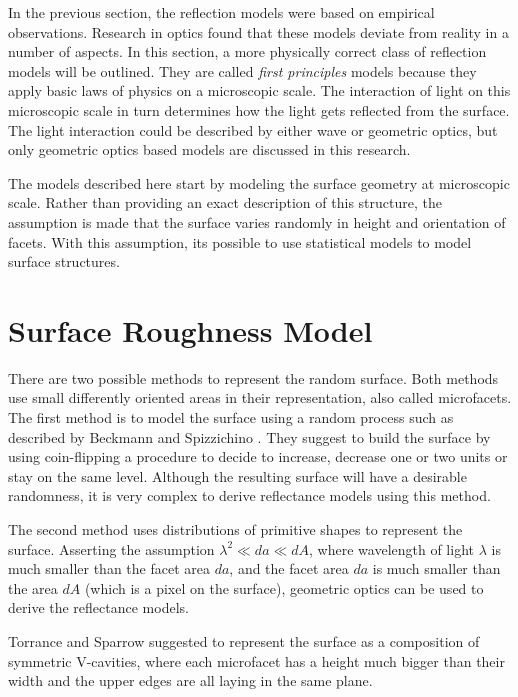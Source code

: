 \hypertarget{Microfacet Models}{
}

\noindent In the previous section, the reflection models were based on empirical observations. Research in optics found that these models deviate from reality in a number of aspects. In this section, a more physically correct class of reflection models will be outlined. They are called \textit{first principles} models because they apply basic laws of physics on a microscopic scale. The interaction of light on this microscopic scale in turn determines how the light gets reflected from the surface. The light interaction could be described by either wave or geometric optics, but only geometric optics based models are discussed in this research.

The models described here start by modeling the surface geometry at microscopic scale. Rather than providing an exact description of this structure, the assumption is made that the surface varies randomly in height and orientation of facets. With this assumption, its possible to use statistical models to model surface structures.

\section{Surface Roughness Model}
There are two possible methods to represent the random surface. Both methods use small differently oriented areas in their representation, also called microfacets. The first method is to model the surface using a random process such as described by Beckmann and Spizzichino \cite{BeckmannSpizzichino}. They suggest to build the surface by using coin-flipping a procedure to decide to increase, decrease one or two units or stay on the same level. Although the resulting surface will have a desirable randomness, it is very complex to derive reflectance models using this method. 

The second method uses distributions of primitive shapes to represent the surface. Asserting the assumption $\lambda^2 \ll da \ll dA$, where wavelength of light $\lambda$ is much smaller than the facet area $da$, and the facet area $da$ is much smaller than the area $dA$ (which is a pixel on the surface), geometric optics can be used to derive the reflectance models. 

Torrance and Sparrow suggested to represent the surface as a composition of symmetric V-cavities, where each microfacet has a height much bigger than their width and the upper edges are all laying in the same plane.

